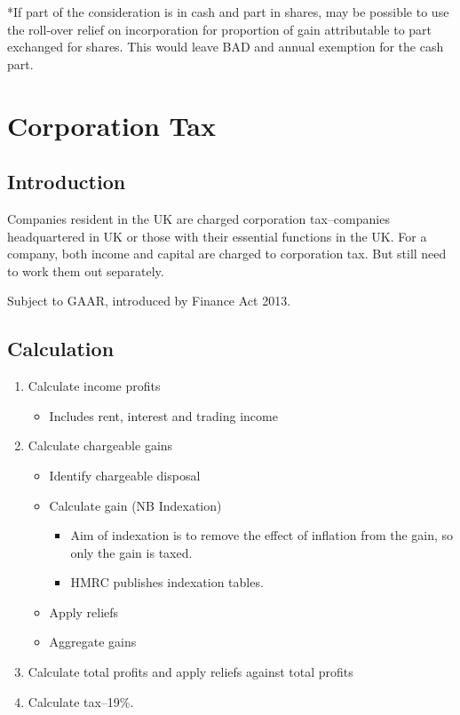 \documentclass[
]{article}
\providecommand{\tightlist}{%
  \setlength{\itemsep}{0pt}\setlength{\parskip}{0pt}}
\begin{document}
*If part of the consideration is in cash and part in shares, may be
possible to use the roll-over relief on incorporation for proportion of
gain attributable to part exchanged for shares. This would leave BAD and
annual exemption for the cash part.

\hypertarget{corporation-tax}{%
\section{Corporation Tax}\label{corporation-tax}}

\hypertarget{introduction-3}{%
\subsection{Introduction}\label{introduction-3}}

Companies resident in the UK are charged corporation tax--companies
headquartered in UK or those with their essential functions in the UK.
For a company, both income and capital are charged to corporation tax.
But still need to work them out separately.

Subject to GAAR, introduced by Finance Act 2013.

\hypertarget{calculation-2}{%
\subsection{Calculation}\label{calculation-2}}

\begin{enumerate}
\def\labelenumi{\arabic{enumi}.}
\tightlist
\item
  Calculate income profits

  \begin{itemize}
  \tightlist
  \item
    Includes rent, interest and trading income
  \end{itemize}
\item
  Calculate chargeable gains

  \begin{itemize}
  \tightlist
  \item
    Identify chargeable disposal
  \item
    Calculate gain (NB Indexation)

    \begin{itemize}
    \tightlist
    \item
      Aim of indexation is to remove the effect of inflation from the
      gain, so only the gain is taxed.
    \item
      HMRC publishes indexation tables.
    \end{itemize}
  \item
    Apply reliefs
  \item
    Aggregate gains
  \end{itemize}
\item
  Calculate total profits and apply reliefs against total profits
\item
  Calculate tax--19\%.
\end{enumerate}
\end{document}
